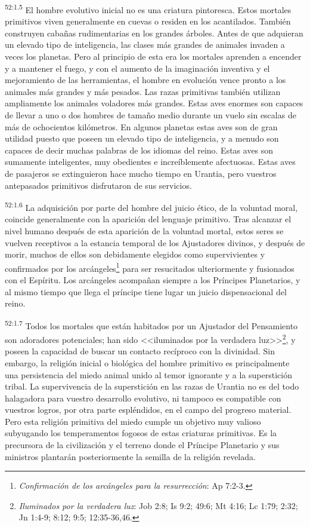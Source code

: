 \par
\textsuperscript{52:1.5} El hombre evolutivo inicial no es una criatura pintoresca. Estos mortales primitivos viven generalmente en cuevas o residen en los acantilados. También construyen cabañas rudimentarias en los grandes árboles. Antes de que adquieran un elevado tipo de inteligencia, las clases más grandes de animales invaden a veces los planetas. Pero al principio de esta era los mortales aprenden a encender y a mantener el fuego, y con el aumento de la imaginación inventiva y el mejoramiento de las herramientas, el hombre en evolución vence pronto a los animales más grandes y más pesados. Las razas primitivas también utilizan ampliamente los animales voladores más grandes. Estas aves enormes son capaces de llevar a uno o dos hombres de tamaño medio durante un vuelo sin escalas de más de ochocientos kilómetros. En algunos planetas estas aves son de gran utilidad puesto que poseen un elevado tipo de inteligencia, y a menudo son capaces de decir muchas palabras de los idiomas del reino. Estas aves son sumamente inteligentes, muy obedientes e increíblemente afectuosas. Estas aves de pasajeros se extinguieron hace mucho tiempo en Urantia, pero vuestros antepasados primitivos disfrutaron de sus servicios.

\par
\textsuperscript{52:1.6} La adquisición por parte del hombre del juicio ético, de la voluntad moral, coincide generalmente con la aparición del lenguaje primitivo. Tras alcanzar el nivel humano después de esta aparición de la voluntad mortal, estos seres se vuelven receptivos a la estancia temporal de los Ajustadores divinos, y después de morir, muchos de ellos son debidamente elegidos como supervivientes y confirmados por los arcángeles\footnote{\textit{Confirmación de los arcángeles para la resurrección}: Ap 7:2-3.} para ser resucitados ulteriormente y fusionados con el Espíritu. Los arcángeles acompañan siempre a los Príncipes Planetarios, y al mismo tiempo que llega el príncipe tiene lugar un juicio dispensacional del reino.

\par
\textsuperscript{52:1.7} Todos los mortales que están habitados por un Ajustador del Pensamiento son adoradores potenciales; han sido <<iluminados por la verdadera luz>>\footnote{\textit{Iluminados por la verdadera luz}: Job 2:8; Is 9:2; 49:6; Mt 4:16; Lc 1:79; 2:32; Jn 1:4-9; 8:12; 9:5; 12:35-36,46.}, y poseen la capacidad de buscar un contacto recíproco con la divinidad. Sin embargo, la religión inicial o biológica del hombre primitivo es principalmente una persistencia del miedo animal unido al temor ignorante y a la superstición tribal. La supervivencia de la superstición en las razas de Urantia no es del todo halagadora para vuestro desarrollo evolutivo, ni tampoco es compatible con vuestros logros, por otra parte espléndidos, en el campo del progreso material. Pero esta religión primitiva del miedo cumple un objetivo muy valioso subyugando los temperamentos fogosos de estas criaturas primitivas. Es la precursora de la civilización y el terreno donde el Príncipe Planetario y sus ministros plantarán posteriormente la semilla de la religión revelada.

